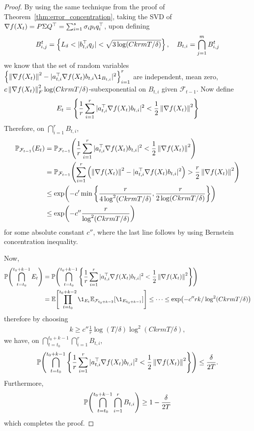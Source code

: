 \begin{proof}
    By using the same technique from the proof of Theorem~\ref{thm:error_concentration}, taking the SVD of $\grad f(X_t) = P \Sigma Q^\top = \sum_{i=1}^s \sigma_i p_i q_i^\top$, upon defining
    \begin{align*}
        B_{i,j}^t = \set{L_\delta < |b_{t,i}^\top q_j| < \sqrt{3\log(CkrmT/\delta)}}, \quad B_{t,i} = \bigcap_{j=1}^m B_{i,j}^t
    \end{align*}
    we know that the set of random variables $\set{\mg{\grad f(X_t)}^2 - |a_{t,i}^\top\grad f(X_t) b_{t,i} \1_{B_{t,i}}|^2}_{i=1}^r$ are independent, mean zero, $c\mg{\grad f(X_t)}_F^2 \log(CkrmT/\delta)$-subexponential on $B_{t,i}$ given $\mathcal F_{t-1}$. 
    Now define
    \begin{align*}
        E_t = \set{\frac 1r \sum_{i=1}^r |a_{t,i}^\top \grad f(X_t) b_{t,i}|^2 < \frac 12 \mg{\grad f(X_t)}^2}
    \end{align*}
    Therefore, on $\bigcap_{i=1}^r B_{t,i}$,
    \begin{align*}
        \Pt(E_t) &= \Pt(\frac{1}{r} \sum_{i=1}^r |a_{t,i}^\top \grad f(X_t) b_{t,i}|^2 < \frac{1}{2}\mg{\grad f(X_t)}^2) 
        \\&= \Pt(\sum_{i=1}^r \qty(\mg{\grad f(X_t)}^2 - |a_{t,i}^\top \grad f(X_t) b_{t,i}|^2) > \frac r2 \mg{\grad f(X_t)}^2) \\&\leq \exp(-c' \min\set{\frac{r}{4\log^2(CkrmT/\delta)}, \frac{r}{2\log(CkrmT/\delta)}}) 
        \\&\leq \exp(-c'' \frac{r}{\log^2(CkrmT/\delta)})
    \end{align*}
    for some absolute constant $c''$, where the last line follows by using Bernstein concentration inequality.

    Now,
    \begin{align*}
        \P(\bigcap_{t=t_0}^{t_0+k-1} E_t) &= \P(\bigcap_{t=t_0}^{t_0+k-1} \set{\frac 1r \sum_{i=1}^r |a_{t,i}^\top \grad f(X_t) b_{t,i}|^2 < \frac 12 \mg{\grad f(X_t)}^2})  \\
        &= \E[\prod_{t=t_0}^{t_0+k-2} \1_{E_t} \mathbb E_{\mathcal F_{t_0+k-2}}[\1_{E_{t_0+k-1}}]] \leq \cdots \leq \exp(-c'' rk / \log^2(CkrmT/\delta))
    \end{align*}
    therefore by choosing 
    \begin{align*}
        k \geq c'' \frac{1}{r}\log(T/\delta) \log^2(Ckrm T / \delta),
    \end{align*} 
    we have, on $\bigcap_{t=t_0}^{t_0 + k - 1} \bigcap_{i=1}^r B_{t,i}$,
    \begin{align*}
        \P(\bigcap_{t=t_0}^{t_0+k-1} \set{\frac{1}{r} \sum_{i=1}^r |a_{t,i}^\top \grad f(X_t) b_{t,i}|^2 < \frac 12 \mg{\grad f(X_t)}^2}) \leq \frac{\delta}{2T}.
    \end{align*}
    Furthermore, 
    \begin{align*}
        \P(\bigcap_{t=t_0}^{t_0 + k - 1} \bigcap_{i=1}^r B_{t,i}) \geq 1- \frac{\delta}{2T}
    \end{align*}
    which completes the proof.
\end{proof}

